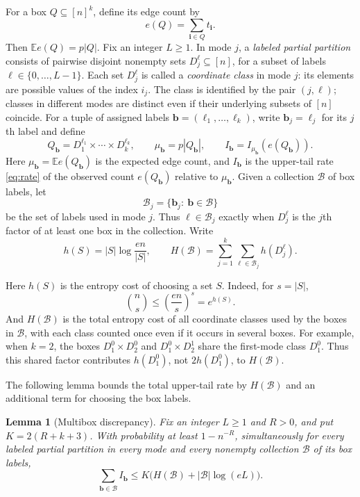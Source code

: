 \documentclass[10pt,a4paper]{amsart}
\numberwithin{equation}{section}
\newtheorem{lemma}[theorem]{Lemma}
\newcommand{\E}{\mathbb E}
\begin{document}
For a box $Q\subseteq[n]^k$, define its edge count by
\begin{equation}\label{eq:edge-count}
 e(Q)=\sum_{\mathbf i\in Q}t_{\mathbf i}.
\end{equation}
Then $\E e(Q)=p|Q|$.
Fix an integer $L\ge1$. In mode $j$, a
\emph{labeled partial partition} consists of pairwise disjoint nonempty
sets $D_j^\ell\subseteq[n]$, for a subset of labels
$\ell\in\{0,\ldots,L-1\}$. 
Each set $D_j^\ell$ is called a \emph{coordinate class} in mode $j$:
its elements are possible values of the index $i_j$.
The class is identified by the pair $(j,\ell)$; classes in different
modes are distinct even if their underlying subsets of $[n]$ coincide.
For a tuple of assigned labels $\mathbf{b}=(\ell_1,\ldots,\ell_k)$,
write $\mathbf{b}_j=\ell_j$ for its $j$th label and define
\[
 Q_{\mathbf{b}}=D_1^{\ell_1}\times\cdots\times D_k^{\ell_k},\qquad
 \mu_{\mathbf{b}}=p|Q_{\mathbf{b}}|,\qquad
 I_{\mathbf{b}}=I_{\mu_{\mathbf{b}}}(e(Q_{\mathbf{b}})).
\]
Here $\mu_{\mathbf{b}}=\E e(Q_{\mathbf{b}})$ is the expected edge count,
and $I_{\mathbf{b}}$ is the upper-tail rate \eqref{eq:rate} of the observed
count $e(Q_{\mathbf{b}})$ relative to $\mu_{\mathbf{b}}$.
Given a collection $\mathcal B$ of box labels, let
\[
 \mathcal B_j=\{\mathbf{b}_j:\ \mathbf{b}\in\mathcal B\}
\]
be the set of labels used in mode $j$. Thus $\ell\in\mathcal B_j$
exactly when $D_j^\ell$ is the $j$th factor of at least one box
in the collection. Write
\[
 h(S)=|S|\log\frac{en}{|S|},\qquad
H(\mathcal B)=\sum_{j=1}^k\sum_{\ell\in\mathcal B_j}h(D_j^\ell).
\]


Here $h(S)$ is the entropy cost of choosing a set $S$. Indeed, for $s=|S|$,
\[
 \binom ns\le\left(\frac{en}{s}\right)^s=e^{h(S)}.
\]
And
$H(\mathcal B)$ is the total entropy cost of all coordinate classes
used by the boxes in $\mathcal B$, with each class counted once even
if it occurs in several boxes. For example, when $k=2$, the boxes $D_1^0\times D_2^0$ and
$D_1^0\times D_2^1$ share the first-mode class $D_1^0$.
Thus this shared factor contributes $h(D_1^0)$, not $2h(D_1^0)$,
to $H(\mathcal B)$.


The following lemma bounds the total upper-tail rate by
$H(\mathcal B)$ and an additional term for choosing the box labels.

\begin{lemma}[Multibox discrepancy]\label{lem:local}
Fix an integer $L\ge1$ and $R>0$, and put $K=2(R+k+3)$.
With probability at least
$1-n^{-R}$, simultaneously for every labeled partial partition in every
mode and every nonempty collection $\mathcal B$ of its box labels,
\begin{equation}\label{eq:local-budget}
 \sum_{\mathbf{b}\in\mathcal B}I_{\mathbf{b}}
 \le K\bigl(H(\mathcal B)+|\mathcal B|\log(eL)\bigr).
\end{equation}
\end{lemma}
\end{document}
